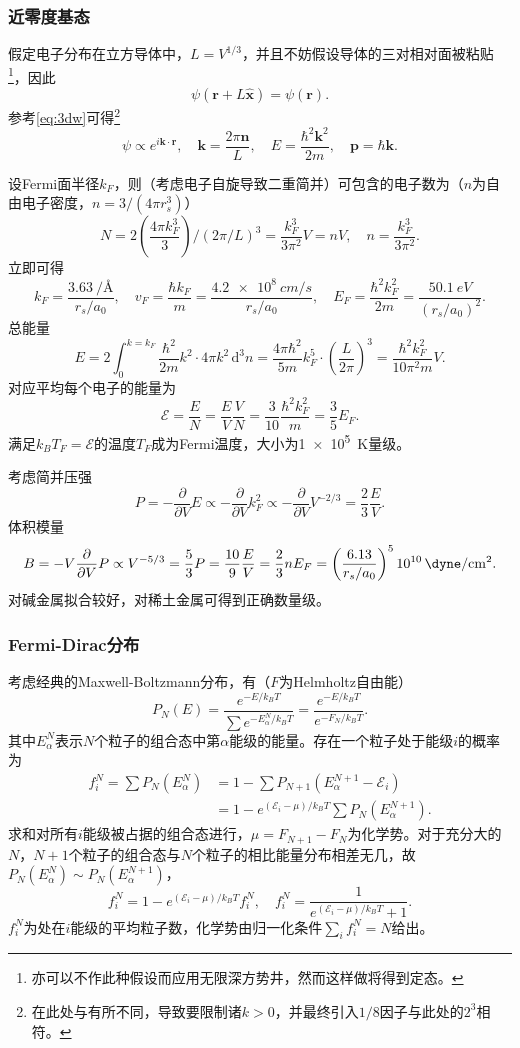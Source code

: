 \documentclass{ctexart}
\newcommand{\ddel}[1]{\frac{\partial}{\partial #1}}
\newcommand{\ddV}{\ddel{V}}
\newcommand{\pare}[1]{\left( #1 \right)}
\newcommand{\rec}[1]{\frac{1}{#1}}
\newcommand{\vk}{\boldsymbol{k}}
\newcommand{\vn}{\boldsymbol{n}}
\newcommand{\vp}{\boldsymbol{p}}
\newcommand{\vr}{\boldsymbol{r}}
\newcommand{\vx}{\boldsymbol{x}}
\newcommand{\cE}{\mathcal{E}}
\newcommand{\fconclu}{\boxed}
\newcommand{\intu}[3]{\int_0^{#1} #2 \,\mathrm{d} #3}
\newcommand{\bfactor}[1]{e^{-#1/k_BT}}
\newcommand{\pbfactor}[1]{e^{#1/k_BT}}
\begin{document}
\subsubsection{近零度基态}
假定电子分布在立方导体中，$L=V^{1/3}$，并且不妨假设导体的三对相对面被粘贴\footnote{亦可以不作此种假设而应用无限深方势井\cite{iqm}，然而这样做将得到定态。}，因此
\[ \psi\pare{\vr + L\hat{\vx}} = \psi\pare{\vr}. \]
参考\eqref{eq:3dw}可得\footnote{\cite{iqm}在此处与\cite{ssph}有所不同，导致\cite{iqm}要限制诸$k>0$，并最终引入$1/8$因子与此处的$2^3$相符。}
\[ \psi \propto e^{i\vk\cdot\vr}, \quad \vk = \frac{2\pi\vn}{L}, \quad E = \frac{\hbar^2\vk^2}{2m}, \quad \vp=\hbar\vk.  \]
\par
设Fermi面半径$k_F$，则（考虑电子自旋导致二重简并）可包含的电子数为（$n$为自由电子密度，$n=3/\pare{4\pi r_s^3}$）
\begin{equation}
\label{eq:fmn}
N = 2\pare{\frac{4\pi k_F^3}{3}}/\pare{2\pi/L}^3 = \frac{k_F^3}{3\pi^2}V = nV, \quad \fconclu{n = \frac{k_F^3}{3\pi^2}.}
\end{equation}
立即可得
\[ k_F = \frac{\SI{3.63}{\per\angstrom}}{r_s/a_0}, \quad v_F = \frac{\hbar k_F}{m} = \frac{\SI{4.2e8}{cm/s}}{r_s/a_0}, \quad E_F = \frac{\hbar^2 k_F^2}{2m} = \frac{\SI{50.1}{eV}}{\pare{r_s/a_0}^2}. \]
总能量
\[ E = 2 \intu{k=k_F}{\frac{\hbar^2}{2m}k^2\cdot 4\pi k^2}{^3n} = \frac{4\pi\hbar^2}{5m}k_F^5\cdot \pare{\frac{L}{2\pi}}^3 = \frac{\hbar^2 k_F^2}{10\pi^2 m}V. \]
对应平均每个电子的能量为
\[ \cE = \frac{E}{N} = \frac{E}{V}\frac{V}{N} = \frac{3}{10}\frac{\hbar^2 k_F^2}{m} = \frac{3}{5}E_F. \]
满足$k_BT_F=\cE$的温度$T_F$成为Fermi温度，大小为\SI{1e5}{K}量级。
\par
考虑简并压强
\[ P=-\ddV E \propto -\ddV k_F^2 \propto -\ddV V^{-2/3} = \frac{2}{3}\frac{E}{V}.  \]
体积模量
\[ B = -V\ddV P \propto V^{-5/3} = \frac{5}{3}P = \frac{10}{9}\frac{E}{V} = \frac{2}{3}nE_F = \pare{\frac{6.13}{r_s/a_0}}^5\SI[per-mode=fraction]{e10}{\dyne\per\square\cm}. \]
对碱金属拟合较好，对稀土金属可得到正确数量级。
\subsubsection{Fermi-Dirac分布}
考虑经典的Maxwell-Boltzmann分布，有（$F$为Helmholtz自由能）
\[ P_N\pare{E} = \frac{\bfactor{E}}{\sum\bfactor{E_\alpha^N}} = \frac{\bfactor{E}}{\bfactor{F_N}}. \]
其中$E_\alpha^N$表示$N$个粒子的组合态中第$\alpha$能级的能量。存在一个粒子处于能级$i$的概率为
\begin{align*}f_i^N = \sum P_N\pare{E_\alpha^N} &= 1 - \sum P_{N+1}\pare{E_\alpha^{N+1} - \cE_i}\\ 
&= 1-\pbfactor{\pare{\cE_i-\mu}} \sum P_N\pare{E_\alpha^{N+1}}.
\end{align*}
求和对所有$i$能级被占据的组合态进行，$\mu = F_{N+1}-F_N$为化学势。对于充分大的$N$，$N+1$个粒子的组合态与$N$个粒子的相比能量分布相差无几，故$P_N\pare{E_\alpha^{N}}\sim P_N\pare{E_\alpha^{N+1}}$，
\[ f_i^N = 1 - \pbfactor{\pare{\cE_i-\mu}} f_i^N, \quad f_i^N = \rec{\pbfactor{\pare{\cE_i - \mu}} + 1}.\]
$f_i^N$为处在$i$能级的平均粒子数，化学势由归一化条件$\sum_i f_i^N = N$给出。
\end{document}
